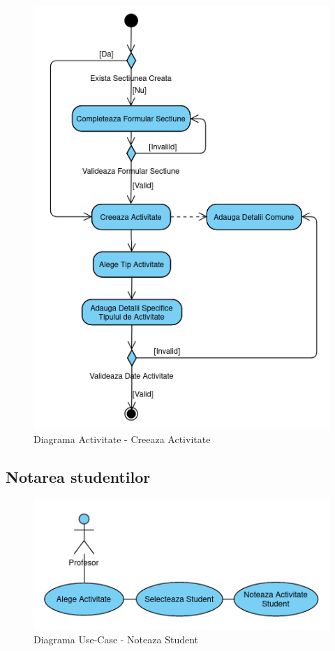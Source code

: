 \documentclass[12pt, a4paper, oneside, romanian]{teza-upb}
\begin{document}
\begin{figure}[H]
\centering
\includegraphics*[width=0.65\columnwidth]{diagrama-activitate-creeaza-activitate}
\caption{Diagrama Activitate - Creeaza Activitate}
\label{diagrama-activitate-creeaza-activitate}
\end{figure}


\subsection{Notarea studentilor}

\begin{figure}[H]
\centering
\includegraphics*[width=0.65\columnwidth]{diagrama-use-case-noteaza-student}
\caption{Diagrama Use-Case - Noteaza Student}
\label{diagrama-use-case-noteaza-student}
\end{figure}
\end{document}
